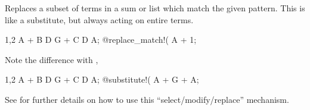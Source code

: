 
Replaces a subset of terms in a sum or list which match the given
pattern. This is like a substitute, but always acting on entire terms. 
\begin{screen}{1,2}
A + B D G + C D A;
@replace_match!(%
A + 1;
\end{screen}
Note the difference with ,
\begin{screen}{1,2}
A + B D G + C D A;
@substitute!(%
A + G + A;
\end{screen}
See  for further details on how to use this
``select/modify/replace'' mechanism.



